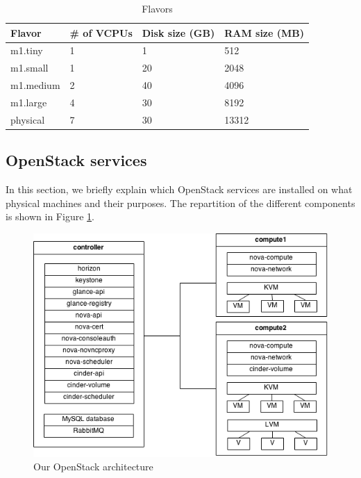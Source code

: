 \begin{table}[h]
	\centering
	\begin{tabular}{|l|l|l|l|}
		\hline
		\textbf{Flavor} & \textbf{\# of VCPUs} & \textbf{Disk size (GB)} & \textbf{RAM size (MB)}\\
		\hline
		m1.tiny & 1 & 1 & 512 \\
		m1.small & 1 & 20 & 2048 \\
		m1.medium & 2 & 40 & 4096 \\
		m1.large & 4 & 30 & 8192 \\
		physical & 7 & 30 & 13312 \\
		\hline
	\end{tabular}
	\caption{Flavors}
	\label{table:flavors_list_2}
\end{table}



\subsection{OpenStack services} %
In this section, we briefly explain which OpenStack services are installed on what physical machines and their purposes.
The repartition of the different components is shown in Figure \ref{fig:os_arch}.

\begin{figure}[h]
	\centering
	\includegraphics[scale=0.6]{figures/os_arch.png}
	\caption{Our OpenStack architecture}
	\label{fig:os_arch}
\end{figure}

